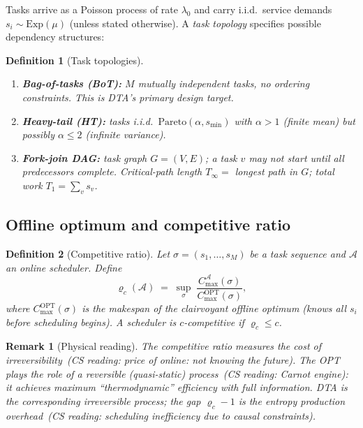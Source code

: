 \documentclass[11pt,a4paper]{article}
\newtheorem{definition}{Definition}[section]
\newtheorem{remark}{Remark}[section]
\newcommand{\physics}[2]{#1\ \textnormal{(\emph{CS reading}: #2)}}
\begin{document}
Tasks arrive as a Poisson process of rate $\lambda_0$ and carry i.i.d.\
service demands $s_i \sim \mathrm{Exp}(\mu)$ (unless stated otherwise).
A \emph{task topology} specifies possible dependency structures:

\begin{definition}[Task topologies]
\begin{enumerate}
  \item \textbf{Bag-of-tasks (BoT):} $M$ mutually independent tasks,
        no ordering constraints.  This is DTA's primary design target.
  \item \textbf{Heavy-tail (HT):} tasks i.i.d.\ $\mathrm{Pareto}(\alpha, s_{\min})$
        with $\alpha > 1$ (finite mean) but possibly $\alpha \le 2$ (infinite variance).
  \item \textbf{Fork-join DAG:} task graph $G=(V,E)$; a task $v$ may not
        start until all predecessors complete.  Critical-path length
        $T_\infty = $ longest path in $G$; total work $T_1 = \sum_{v} s_v$.
\end{enumerate}
\end{definition}

\subsection{Offline optimum and competitive ratio}

\begin{definition}[Competitive ratio]
Let $\sigma = (s_1, \ldots, s_M)$ be a task sequence and
$\mathcal{A}$ an online scheduler.  Define
\[
  \varrho_c(\mathcal{A})
  \;=\;
  \sup_{\sigma}\;
  \frac{C_{\max}^{\mathcal{A}}(\sigma)}{C_{\max}^{\mathrm{OPT}}(\sigma)},
\]
where $C_{\max}^{\mathrm{OPT}}(\sigma)$ is the makespan of the \emph{clairvoyant}
offline optimum (knows all $s_i$ before scheduling begins).
A scheduler is \emph{$c$-competitive} if $\varrho_c \le c$.
\end{definition}

\begin{remark}[Physical reading]
The competitive ratio measures the \physics{cost of irreversibility}{price
of online: not knowing the future}.  The OPT plays the role of a
\physics{reversible (quasi-static) process}{Carnot engine}: it achieves
maximum ``thermodynamic'' efficiency with full information.
DTA is the corresponding irreversible process; the gap $\varrho_c - 1$
is the \physics{entropy production overhead}{scheduling inefficiency due
to causal constraints}.
\end{remark}
\end{document}

